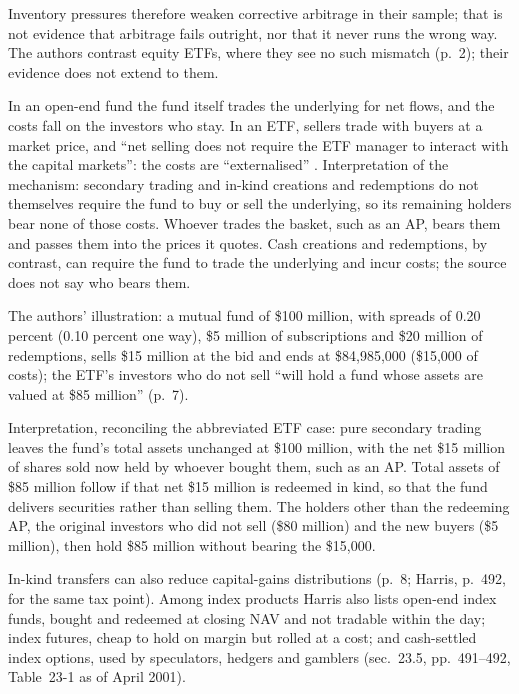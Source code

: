 \begin{qfmechanism}
\begin{itemize}
\begin{itemize}
\end{itemize}
Inventory pressures therefore weaken corrective arbitrage in their sample; that is not evidence that arbitrage fails outright, nor that it never runs the wrong way. The authors contrast equity ETFs, where they see no such mismatch (p.~2); their evidence does not extend to them.
\end{itemize}

 In an open-end fund the fund itself trades the underlying for net flows, and the costs fall on the investors who stay. In an ETF, sellers trade with buyers at a market price, and ``net selling does not require the ETF manager to interact with the capital markets'': the costs are ``externalised'' \citep[p.~7]{ex-lettau-madhavan-2018}. Interpretation of the mechanism: secondary trading and in-kind creations and redemptions do not themselves require the fund to buy or sell the underlying, so its remaining holders bear none of those costs. Whoever trades the basket, such as an AP, bears them and passes them into the prices it quotes. Cash creations and redemptions, by contrast, can require the fund to trade the underlying and incur costs; the source does not say who bears them.

The authors' illustration: a mutual fund of \$100 million, with spreads of 0.20 percent (0.10 percent one way), \$5 million of subscriptions and \$20 million of redemptions, sells \$15 million at the bid and ends at \$84{,}985{,}000 (\$15{,}000 of costs); the ETF's investors who do not sell ``will hold a fund whose assets are valued at \$85 million'' (p.~7).

Interpretation, reconciling the abbreviated ETF case: pure secondary trading leaves the fund's total assets unchanged at \$100 million, with the net \$15 million of shares sold now held by whoever bought them, such as an AP. Total assets of \$85 million follow if that net \$15 million is redeemed in kind, so that the fund delivers securities rather than selling them. The holders other than the redeeming AP, the original investors who did not sell (\$80 million) and the new buyers (\$5 million), then hold \$85 million without bearing the \$15{,}000.

In-kind transfers can also reduce capital-gains distributions (p.~8; Harris, p.~492, for the same tax point). Among index products Harris also lists open-end index funds, bought and redeemed at closing NAV and not tradable within the day; index futures, cheap to hold on margin but rolled at a cost; and cash-settled index options, used by speculators, hedgers and gamblers (sec.~23.5, pp.~491--492, Table~23-1 as of April 2001).


\end{qfmechanism}
